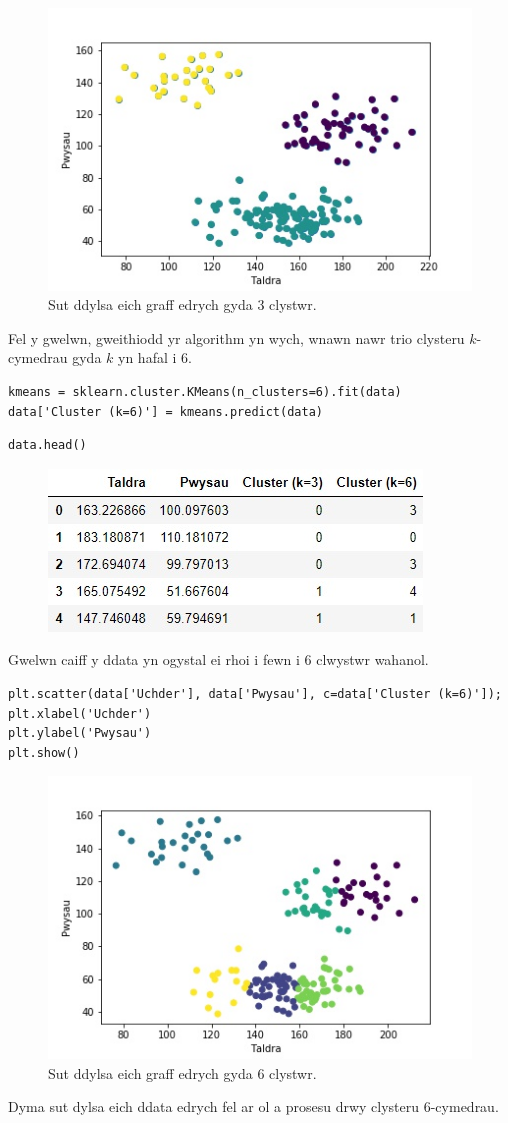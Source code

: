 \begin{figure}[h!]
\begin{center}
\includegraphics[width=0.7\linewidth]{../img/3clystwrpython.jpeg}
\caption{Sut ddylsa eich graff edrych gyda 3 clystwr.}
\label{fig:3clystwrpython}
\end{center}
\end{figure}

Fel y gwelwn, gweithiodd yr algorithm yn wych, wnawn nawr trio clysteru $k$-cymedrau gyda $k$ yn hafal i 6.

\begin{verbatim}
kmeans = sklearn.cluster.KMeans(n_clusters=6).fit(data)
data['Cluster (k=6)'] = kmeans.predict(data)
\end{verbatim}

\begin{verbatim}
data.head()
\end{verbatim}

\begin{figure}[h!]
\includegraphics[width=0.35\linewidth]{../img/tabl3.jpg}
\label{fig:Data3}
\end{figure}

Gwelwn caiff y ddata yn ogystal ei rhoi i fewn i 6 clwystwr wahanol. 

\begin{verbatim}
plt.scatter(data['Uchder'], data['Pwysau'], c=data['Cluster (k=6)']);
plt.xlabel('Uchder')
plt.ylabel('Pwysau')
plt.show()
\end{verbatim}

\begin{figure}[h!]
\begin{center}
\includegraphics[width=0.7\linewidth]{../img/6clystwrpython.jpeg}
\caption{Sut ddylsa eich graff edrych gyda 6 clystwr.}
\label{fig:6clystwrpython}
\end{center}
\end{figure}

Dyma sut dylsa eich ddata edrych fel ar ol a prosesu drwy clysteru 6-cymedrau. 
